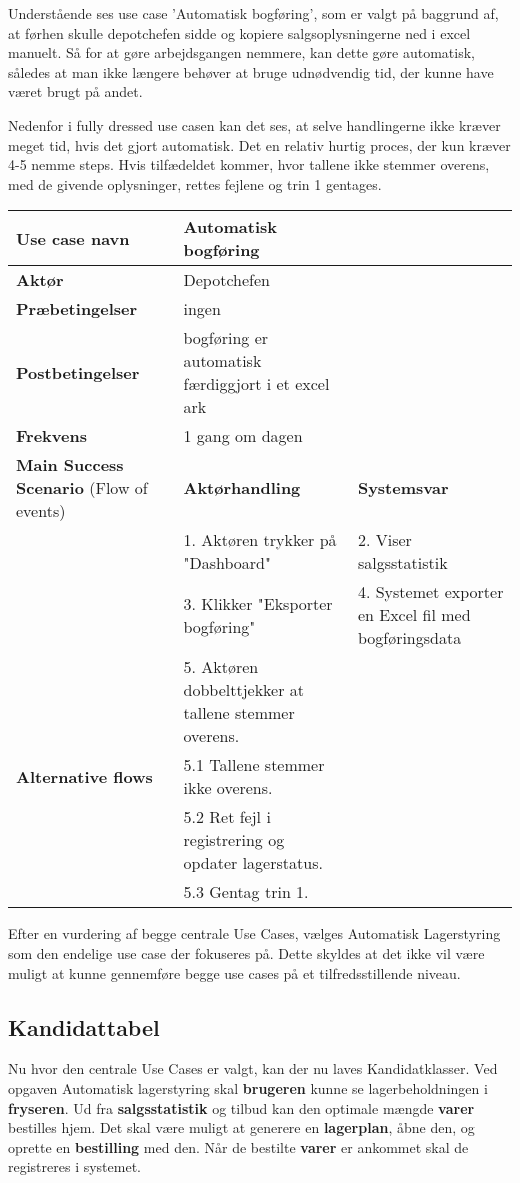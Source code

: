 Understående ses use case 'Automatisk bogføring', som er valgt på baggrund af, at førhen skulle depotchefen sidde og kopiere salgsoplysningerne ned i excel manuelt. Så for at gøre arbejdsgangen nemmere, kan dette gøre automatisk, således at man ikke længere behøver at bruge udnødvendig tid, der kunne have været brugt på andet. 

Nedenfor i fully dressed use casen kan det ses, at selve handlingerne ikke kræver meget tid, hvis det gjort automatisk. Det en relativ hurtig proces, der kun kræver 4-5 nemme steps. 
Hvis tilfædeldet kommer, hvor tallene ikke stemmer overens, med de givende oplysninger, rettes fejlene og trin 1 gentages. 

\begin{longtable}{ |p{120pt}|p{120pt}|p{120pt}| }
    \hline
    \textbf{Use case navn} & Automatisk bogføring & \\
    \hline
    \textbf{Aktør} & Depotchefen & \\
    \hline
    \textbf{Præbetingelser} & ingen & \\
    \hline
    \textbf{Postbetingelser} & bogføring er automatisk færdiggjort i et excel ark & \\
    \hline
    \textbf{Frekvens} & 1 gang om dagen & \\
    \hline
    \textbf{Main Success Scenario} (Flow of events) & \textbf{Aktørhandling} & \textbf{Systemsvar} \\
    \hline
    & 1. Aktøren trykker på "Dashboard" & 2. Viser salgsstatistik \\
    \hline
    & 3. Klikker "Eksporter bogføring" & 4. Systemet exporter en Excel fil med bogføringsdata \\
    \hline
    & 5. Aktøren dobbelttjekker at tallene stemmer overens. & \\
    \hline
    \textbf{Alternative flows} & 5.1 Tallene stemmer ikke overens. & \\
    \hline 
    & 5.2 Ret fejl i registrering og opdater lagerstatus. & \\
    \hline
    & 5.3 Gentag trin 1. & \\
    \hline
\end{longtable}

Efter en vurdering af begge centrale Use Cases, vælges Automatisk Lagerstyring som den endelige use case der fokuseres på. Dette skyldes at det ikke vil være muligt at kunne gennemføre begge use cases på et tilfredsstillende niveau.

\subsection{Kandidattabel}
Nu hvor den centrale Use Cases er valgt, kan der nu laves Kandidatklasser. 
Ved opgaven Automatisk lagerstyring skal \textbf{brugeren} kunne se lagerbeholdningen i \textbf{fryseren}. Ud fra \textbf{salgsstatistik} og tilbud kan den optimale mængde \textbf{varer} bestilles hjem. Det skal være muligt at generere en \textbf{lagerplan}, åbne den, og oprette en \textbf{bestilling} med den. Når de bestilte \textbf{varer} er ankommet skal de registreres i systemet.




